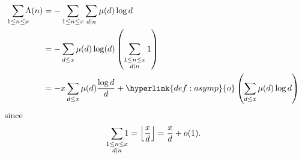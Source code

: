 \documentclass{article}
\DeclarePairedDelimiter\floor{\lfloor}{\rfloor}
\begin{document}
\begin{eg}
  \begin{align*}
    \sum_{\mathclap{1\leq n \leq x}}\Lambda(n) &= -\sum_{1\leq n\leq x}\sum_{d|n}\mu(d)\log d \\
                                    &= - \sum_{d\leq x}\mu(d)\log(d)\left(\sum_{\substack{1\leq n\leq x \\ d|n}}1\right) \\
                                    &= - x \sum_{d\leq x}\mu(d) \frac{\log d}{d} + \hyperlink{def:asymp}{o}\left(\sum_{d\leq x}\mu(d)\log d \right)
  \end{align*}
  since
  \begin{equation*}
    \sum_{\mathclap{\substack{1\leq n\leq x \\ d|n}}}1 = \floor*{\frac{x}{d}}= \frac{x}{d} + o(1).
  \end{equation*}
\end{eg}
\clearpage
\printnomenclature
\printindex
\end{document}

